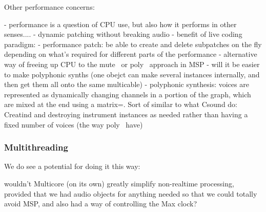 \documentclass[twoside,a4paper]{article}
\begin{document}
 
Other performance concerns:

- performance is a question of CPU use, but also how it performs in other senses....
- dynamic patching without breaking audio
- benefit of live coding paradigm:
    - performance patch: be able to create and delete subpatches on the fly depending on what's required for different parts of the performance
    - alternative way of freeing up CPU to the mute~ or poly~ approach in MSP
    - will it be easier to make polyphonic synths (one obejct can make several instances internally, and then get them all onto the same multicable)
    - polyphonic synthesis: voices are represented as dynamically changing channels in a portion of the graph, which are mixed at the end using a matrix=. Sort of similar to what Csound do: Creatind and destroying instrument instances as needed rather than having a fixed number of voices (the way poly~ have)

%


\subsubsection{Multithreading} %


We do see a potential for doing it this way:

wouldn't Multicore (on its own) greatly simplify non-realtime processing, provided that we had audio objects for anything needed so that we could totally avoid MSP, and also had a way of controlling the Max clock?

\end{document}
